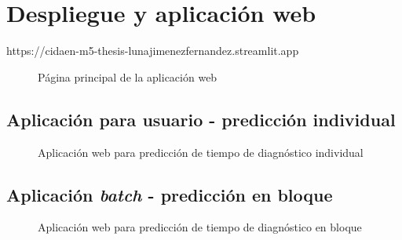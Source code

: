 \chapter{Despliegue y aplicación web}

https://cidaen-m5-thesis-lunajimenezfernandez.streamlit.app

\begin{figure}[h]
	\centering
	\captionsetup{belowskip=-15pt, justification=centering}
	\caption{Página principal de la aplicación web}
	\label{fig:ch6main}
\end{figure}

\section{Aplicación para usuario - predicción individual}

\begin{figure}[h]
	\centering
	\captionsetup{belowskip=-15pt, justification=centering}
	\caption{Aplicación web para predicción de tiempo de diagnóstico individual}
	\label{fig:ch6single}
\end{figure}

\section{Aplicación \textit{batch} - predicción en bloque}

\begin{figure}[h]
	\centering
	\captionsetup{belowskip=-15pt, justification=centering}
	\caption{Aplicación web para predicción de tiempo de diagnóstico en bloque}
	\label{fig:ch6batch}
\end{figure}